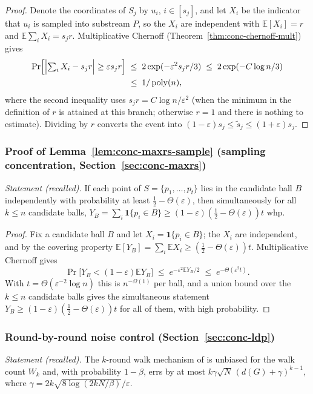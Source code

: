 \begin{proof}
Denote the coordinates of $S_j$ by $u_i$, $i \in [s_j]$, and let $X_i$ be the indicator
that $u_i$ is sampled into substream $P$, so the $X_i$ are independent with
$\mathbb{E}[X_i] = r$ and $\mathbb{E}\sum_i X_i = s_j r$. Multiplicative Chernoff
(Theorem~\ref{thm:conc-chernoff-mult}) gives
\begin{align*}
\Pr\Bigl[\Bigl|\textstyle\sum_i X_i - s_j r\Bigr| \ge \varepsilon s_j r\Bigr]
\;&\le\; 2\exp(-\varepsilon^2 s_j r/3)
\;\le\; 2\exp(-C\log n/3)\\
\;&\le\; 1/\operatorname{poly}(n),
\end{align*}
where the second inequality uses $s_j r = C\log n/\varepsilon^2$ (when the minimum in
the definition of $r$ is attained at this branch; otherwise $r = 1$ and there is nothing
to estimate). Dividing by $r$ converts the event into
$(1-\varepsilon)s_j \le \tilde{s}_j \le (1+\varepsilon)s_j$.
\end{proof}

\subsubsection*{Proof of Lemma~\ref{lem:conc-maxrs-sample} (sampling concentration,
Section~\ref{sec:conc-maxrs})}
{\itshape Statement (recalled).} If each point of $S = \{p_1,\dots,p_t\}$ lies in the
candidate ball $B$ independently with probability at least
$\tfrac12 - \Theta(\varepsilon)$, then simultaneously for all $k \le n$ candidate
balls, $Y_B = \sum_i \mathbf{1}\{p_i \in B\} \ge
(1-\varepsilon)(\tfrac12 - \Theta(\varepsilon))t$ whp.\eop

\begin{proof}
Fix a candidate ball $B$ and let $X_i = \mathbf{1}\{p_i \in B\}$; the $X_i$ are
independent, and by the covering property $\mathbb{E}[Y_B] = \sum_i \mathbb{E}X_i \ge
(\tfrac12 - \Theta(\varepsilon))t$. Multiplicative Chernoff gives
\[
\Pr\bigl[Y_B < (1-\varepsilon)\mathbb{E}Y_B\bigr] \;\le\;
e^{-\varepsilon^2 \mathbb{E}Y_B/2} \;\le\; e^{-\Theta(\varepsilon^2 t)}.
\]
With $t = \Theta(\varepsilon^{-2}\log n)$ this is $n^{-\Omega(1)}$ per ball, and a union
bound over the $k \le n$ candidate balls gives the simultaneous statement
$Y_B \ge (1-\varepsilon)(\tfrac12-\Theta(\varepsilon))t$ for all of them, with high
probability.
\end{proof}

\subsubsection*{Round-by-round noise control (Section~\ref{sec:conc-ldp})}
{\itshape Statement (recalled).} The $k$-round walk mechanism of \cite{sigmod26-012} is
unbiased for the walk count $W_k$ and, with probability $1-\beta$, errs by at most
$k\gamma\sqrt{N}\,(d(G)+\gamma)^{k-1}$, where
$\gamma = 2k\sqrt{8\log(2kN/\beta)}/\varepsilon$.\eop

